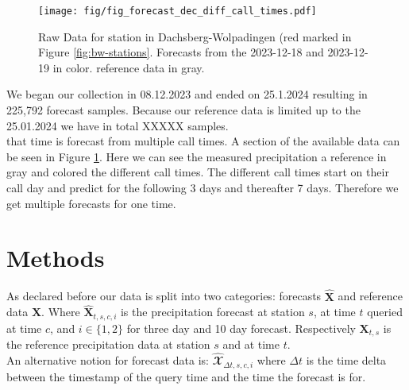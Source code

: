 \documentclass{article}
\theoremstyle{plain}
\theoremstyle{definition}
\theoremstyle{remark}
\begin{document}
\begin{figure}[h]
    \centering
    \label{fig:dec_diff_call_times}
    \texttt{[image: fig/fig\_forecast\_dec\_diff\_call\_times.pdf]}
    \caption{Raw Data for station in Dachsberg-Wolpadingen (red marked in
        Figure \ref{fig:bw-stations}. Forecasts from the 2023-12-18 and 2023-12-19 in
        color. reference data in gray.}

\end{figure}

We began our collection in 08.12.2023 and ended on 25.1.2024 resulting in
225,792 forecast samples. Because our reference data is limited up to the
25.01.2024 we have in total XXXXX samples. \\
that time is forecast from multiple call times.
A section of the available data can be seen in Figure
\ref{fig:dec_diff_call_times}. Here we can see the measured precipitation a
reference in gray and colored the different call times. The different call
times start on their call day and predict for the following 3 days and
thereafter 7 days. Therefore we get multiple forecasts for one time.

\section{Methods}\label{sec:Methods}
As declared before our data is split into two categories: forecasts
$\hat{\textbf{X}}$ and reference data $\textbf{X}$. Where $\hat{\textbf{X}}_{t,
        s, c, i}$ is the precipitation forecast at station $s$, at time $t$ queried at
time $c$, and $i \in \{1, 2\}$ for three day and 10 day forecast. Respectively
$\textbf{X}_{t, s}$ is the reference precipitation data at station $s$ and at
time $t$.\\
An alternative notion for forecast data is: $\hat{\mathbfcal{X}}_{\Delta t, s,
        c, i}$ where $\Delta t$ is the time delta between the timestamp of the query
time and the time the forecast is for.
\end{document}
